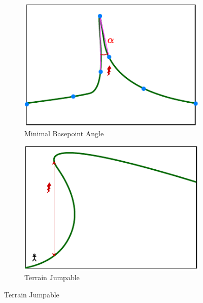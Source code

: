 \begin{figure}[htbp]
  \vspace{.5cm}
  \begin{subfigure}{.5\linewidth}
    \centering
    \includegraphics[width=.97\linewidth]{figures/constraints/MinimalBasepointAngle.pdf}
    \caption{Minimal Basepoint Angle}
    \label{pic:minimalBasepointAngle}
  \end{subfigure}%
  \begin{subfigure}{.5\linewidth}
    \centering
    \includegraphics[width=.948\linewidth]{figures/constraints/TerrainJumpeable.pdf}
    \caption{Terrain Jumpable}
    \label{pic:terrainJumpeable}
  \end{subfigure}


\end{figure}
